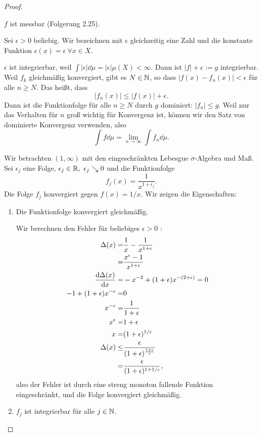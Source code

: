 \begin{proof}
	\begin{parts}
	\item $f$ ist messbar (Folgerung 2.25).

	Sei $\epsilon>0$ beliebig. Wir bezeichnen mit $\epsilon$ gleichzeitig eine Zahl und die konstante Funktion $\epsilon(x)=\epsilon~\forall x\in X$. 

	$\epsilon$ ist integrierbar, weil $\int |\epsilon|\dd{\mu}=|\epsilon|\mu(X)<\infty$. Dann ist $|f|+\epsilon:= g$ integrierbar. Weil $f_k$ gleichmäßig konvergiert, gibt es $N\in \mathbb{N}$, so dass $|f(x)-f_n(x)|<\epsilon$ f\"{u}r alle $n\ge N$. Das heißt, dass
	\[
	|f_n(x)|\le |f(x)|+\epsilon
	.\] 
	Dann ist die Funktionfolge f\"{u}r alle $n\ge N$ durch $g$ dominiert: $|f_n|\le g$. Weil nur das Verhalten f\"{u}r $n$ groß wichtig f\"{u}r Konvergenz ist, können wir den Satz von dominierte Konvergenz verwenden, also 
	\[
		\int f\dd{\mu}=\lim_{n \to \infty} \int f_n\dd{\mu}
	.\] 
\item Wir betrachten $(1,\infty)$ mit den eingeschränkten Lebesgue $\sigma$-Algebra und Maß. Sei $\epsilon_j$ eine Folge, $\epsilon_j\in \mathbb{R},~\epsilon_j\searrow 0$ und die Funktionfolge
	\[
		f_j(x)=\frac{1}{x^{1+\epsilon_j}}
	.\] 
	Die Folge $f_j$ konvergiert gegen $f(x) = 1 / x$. Wir zeigen die Eigenschaften:
	\begin{enumerate}[label=(\roman*)]
		\item Die Funktionfolge konvergiert gleichmäßig.

			Wir berechnen den Fehler f\"{u}r beliebiges $\epsilon>0$ :
			\begin{align*}
				\Delta(x)=&\frac{1}{x}-\frac{1}{x^{1+\epsilon}}\\
				=&\frac{x^{\epsilon}-1}{x^{1+\epsilon}}\\
				\dv{\Delta(x)}{x}=&-x^{-2}+(1+\epsilon)x^{-(2+\epsilon)}=0\\
				-1+(1+\epsilon)x^{-\epsilon}=&0\\
				x^{-\epsilon}=&\frac{1}{1+\epsilon}\\
				x^{\epsilon}=&1+\epsilon\\
				x=&(1+\epsilon)^{1 / \epsilon}\\
				\Delta(x)\le& \frac{\epsilon}{(1+\epsilon)^{\frac{1 + \epsilon}{\epsilon}}}\\
				=& \frac{\epsilon}{(1+\epsilon)^{1+1 /\epsilon}},
			\end{align*}
			also der Fehler ist durch eine streng monoton fallende Funktion eingeschränkt, und die Folge konvergiert gleichmäßig.
		\item $f_j$ ist integrierbar f\"{u}r alle $j\in \mathbb{N}$.


\end{enumerate}
\end{parts}
\end{proof}

